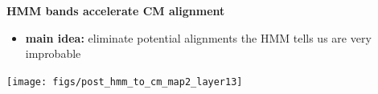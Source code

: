 \documentclass[landscape]{slides}
\begin{document}
\begin{slide}
\begin{center}

\textbf{HMM bands accelerate CM alignment}
\end{center}
\medskip
\small
\begin{itemize}
\item
\textbf{main idea:} eliminate potential alignments the HMM tells us are very improbable
\end{itemize}
\begin{center}
\texttt{[image: figs/post\_hmm\_to\_cm\_map2\_layer13]}
\end{center}
\vfill
\end{slide}
\end{document}
